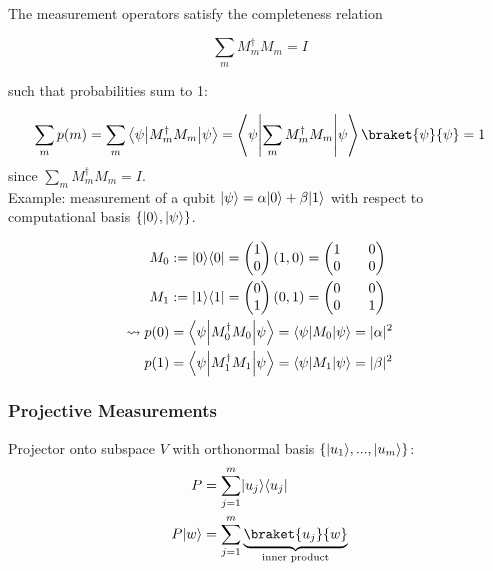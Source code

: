 The measurement operators satisfy the completeness relation

\begin{equation}
    \sum_m M_m^\dag M_m = I
\end{equation}

such that probabilities sum to 1:

\begin{equation}
    \sum_m p(m) 
        = \sum_m \braketmatrix{\psi}{M_m^\dag M_m}{\psi} 
        = \braketmatrix{\psi}{\sum_m M_m^\dag M_m}{\psi} \braket{\psi}{\psi} 
        = 1
\end{equation}
since $\sum_m M_m^\dag M_m = I$. \\
\newline
%
Example: measurement of a qubit $\lvert\psi\rangle = \alpha \lvert0\rangle + \beta \lvert1\rangle$
with respect to computational basis $\{\lvert0\rangle, \lvert\psi\rangle\}$.

\begin{align*}
    M_0 &:= \ket{0} \bra{0} = \begin{pmatrix*}1 \\ 0\end{pmatrix*} (1, 0) = \begin{pmatrix*}
        1 && 0 \\ 0 && 0
    \end{pmatrix*} \\
    M_1 &:= \ket{1} \bra{1} = \begin{pmatrix*}0 \\ 1\end{pmatrix*} (0, 1) = \begin{pmatrix*}
        0 && 0 \\ 0 && 1
    \end{pmatrix*} \\
    \leadsto p(0) &= \braketmatrix{\psi}{M_0^\dag M_0}{\psi} = \braketmatrix{\psi}{M_0}{\psi} = \abs{\alpha}^2 \\
    p(1) &= \braketmatrix{\psi}{M_1^\dag M_1}{\psi} = \braketmatrix{\psi}{M_1}{\psi} = \abs{\beta}^2 \\
\end{align*}

\subsubsection{Projective Measurements}
Projector onto subspace $V$ with orthonormal basis $\{\lvert u_1\rangle, ..., \lvert u_m\rangle\}$:
\begin{align}
    P &= \sum_{j = 1}^m \ket{u_j} \bra{u_j} \\
    P \ket{w} &= \sum_{j = 1}^m \underbrace{\braket{u_j}{w}}_{\text{inner product}}
\end{align}

